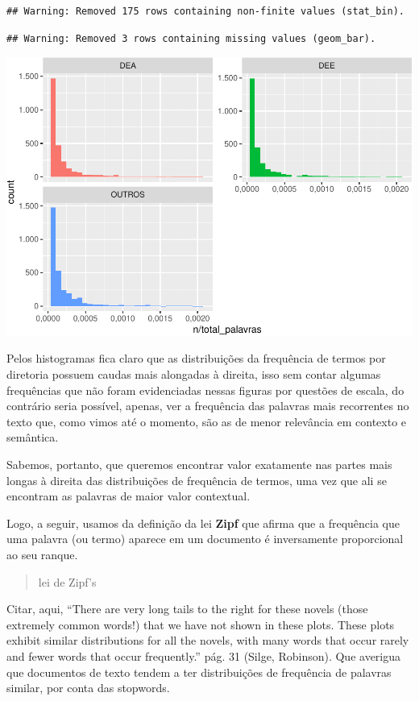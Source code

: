 \documentclass[]{article}
\begin{document}
\begin{verbatim}
## Warning: Removed 175 rows containing non-finite values (stat_bin).
\end{verbatim}

\begin{verbatim}
## Warning: Removed 3 rows containing missing values (geom_bar).
\end{verbatim}

\includegraphics{markdown_v42_files/figure-latex/unnamed-chunk-30-1.pdf}

Pelos histogramas fica claro que as distribuições da frequência de
termos por diretoria possuem caudas mais alongadas à direita, isso sem
contar algumas frequências que não foram evidenciadas nessas figuras por
questões de escala, do contrário seria possível, apenas, ver a
frequência das palavras mais recorrentes no texto que, como vimos até o
momento, são as de menor relevância em contexto e semântica.

Sabemos, portanto, que queremos encontrar valor exatamente nas partes
mais longas à direita das distribuições de frequência de termos, uma vez
que ali se encontram as palavras de maior valor contextual.

Logo, a seguir, usamos da definição da lei \textbf{Zipf} que afirma que
a frequência que uma palavra (ou termo) aparece em um documento é
inversamente proporcional ao seu ranque.

\begin{quote}
lei de Zipf's
\end{quote}

Citar, aqui, ``There are very long tails to the right for these novels
(those extremely common words!) that we have not shown in these plots.
These plots exhibit similar distributions for all the novels, with many
words that occur rarely and fewer words that occur frequently.'' pág. 31
(Silge, Robinson). Que averigua que documentos de texto tendem a ter
distribuições de frequência de palavras similar, por conta das
stopwords.
\end{document}
